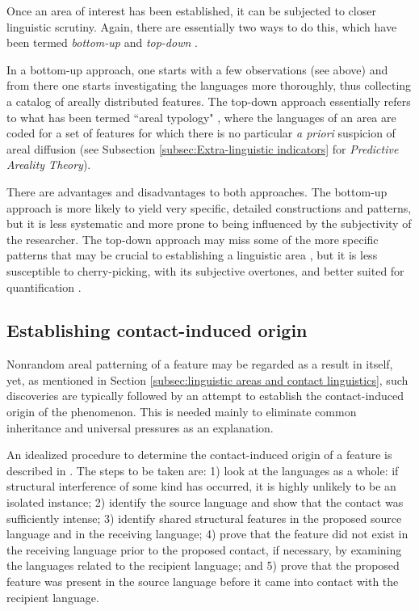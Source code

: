 \documentclass[output=paper]{langscibook}
\begin{document}
Once an area of interest has been established, it can be subjected to closer linguistic scrutiny. Again, there are essentially two ways to do this, which have been termed \textit{bottom-up} and \textit{top-down} \parencite{muysken2008conceptual, Muyskenetal2014Linguistic}.

In a bottom-up approach, one starts with a few observations (see above) and from there one starts investigating the languages more thoroughly, thus collecting a catalog of areally distributed features. The top-down approach essentially refers to what has been termed ``areal typology" \parencite{Dahl2001Principles}, where the languages of an area are coded for a set of features for which there is no particular \textit{a priori} suspicion of areal diffusion (see Subsection \ref{subsec:Extra-linguistic indicators} for \textit{Predictive Areality Theory}).

There are advantages and disadvantages to both approaches. The bottom-up approach is more likely to yield very specific, detailed constructions and patterns, but it is less systematic and more prone to being influenced by the subjectivity of the researcher. The top-down approach may miss some of the more specific patterns that may be crucial to establishing a linguistic area \parencite[see, e.g.,][278--279]{friedman11}, but it is less susceptible to cherry-picking, with its subjective overtones, and better suited for quantification \parencite[see][]{Muyskenetal2014Linguistic}. 

\subsection{Establishing contact-induced origin} \label{sec:establishing}

Nonrandom areal patterning of a feature may be regarded as a result in itself, yet, as mentioned in Section \ref{subsec:linguistic areas and contact linguistics}, such discoveries are typically followed by an attempt to establish the contact-induced origin of the phenomenon. This is needed mainly to eliminate common inheritance and universal pressures as an explanation. 

An idealized procedure to determine the contact-induced origin of a feature is described in \textcite{thomason2010}. The steps to be taken are: 1) look at the languages as a whole: if structural interference of some kind has occurred, it is highly unlikely to be an isolated instance; 2) identify the source language and show that the contact was sufficiently intense; 3) identify shared structural features in the proposed source language and in the receiving language; 4) prove that the feature did not exist in the receiving language prior to the proposed contact, if necessary, by examining the languages related to the recipient language; and 5) prove that the proposed feature was present in the source language before it came into contact with the recipient language.
\end{document}
